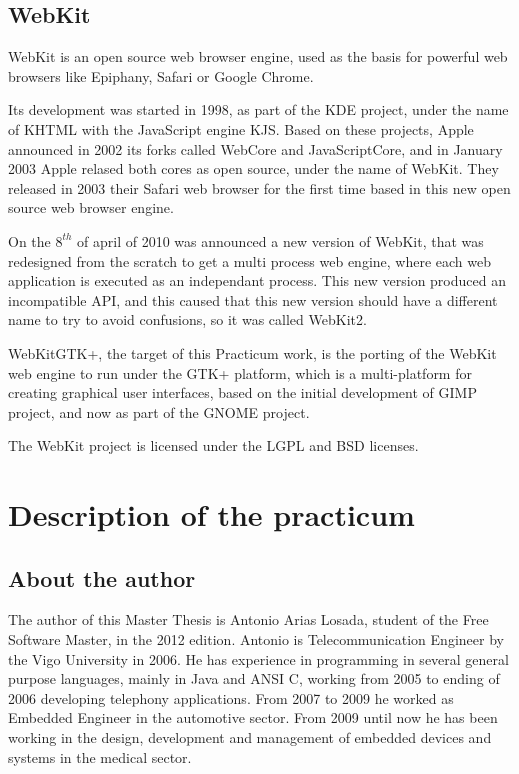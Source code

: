 \documentclass[a4paper,11pt,openany]{report}
\begin{document}
\section{WebKit}
WebKit\cite{webkit} is an open source web browser engine, used as the basis for powerful web browsers like Epiphany, Safari or Google Chrome.

Its development was started in 1998, as part of the KDE project, under the name of KHTML with the JavaScript engine KJS. Based on these projects, Apple announced in 2002 its forks called WebCore and JavaScriptCore, and in January 2003 Apple relased both cores as open source, under the name of WebKit. They released in 2003 their Safari web browser for the first time based in this new open source web browser engine.

On the $8^{th}$ of april of 2010 was announced a new version of WebKit, that was redesigned from the scratch to get a multi process web engine, where each web application is executed as an independant process. This new version produced an incompatible API, and this caused that this new version should have a different name to try to avoid confusions, so it was called WebKit2.

WebKitGTK+, the target of this Practicum work, is the porting of the WebKit web engine to run under the GTK+\cite{gtk+} platform, which is a multi-platform for creating graphical user interfaces, based on the initial development of GIMP\cite{gimp} project, and now as part of the GNOME\cite{gnome} project.

The WebKit project is licensed under the LGPL and BSD licenses.

\chapter{Description of the practicum}

\section{About the author}
The author of this Master Thesis is Antonio Arias Losada, student of the Free Software Master, in the 2012 edition.
Antonio is Telecommunication Engineer by the Vigo University in 2006. He has experience in programming in several general purpose languages, mainly in Java and ANSI C, working from 2005 to ending of 2006 developing telephony applications. From 2007 to 2009 he worked as Embedded Engineer in the automotive sector. From 2009 until now he has been working in the design, development and management of embedded devices and systems in the medical sector.
\end{document}
